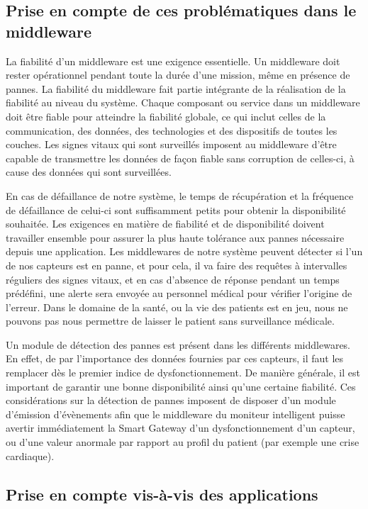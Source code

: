 \subsection{Prise en compte de ces problématiques dans le middleware}
 
La fiabilité d’un middleware est une exigence essentielle. Un middleware doit rester opérationnel pendant toute la durée d’une mission, même en présence de pannes. La fiabilité du middleware fait partie intégrante de la réalisation de la fiabilité au niveau du système. Chaque composant ou service dans un middleware doit être fiable pour atteindre la fiabilité globale, ce qui inclut celles de la communication, des données, des technologies et des dispositifs de toutes les couches. Les signes vitaux qui sont surveillés imposent au middleware d’être capable de transmettre les données de façon fiable sans corruption de celles-ci, à cause des données qui sont surveillées.

En cas de défaillance de notre système, le temps de récupération et la fréquence de défaillance de celui-ci sont suffisamment petits pour obtenir la disponibilité souhaitée. Les exigences en matière de fiabilité et de disponibilité doivent travailler ensemble pour assurer la plus haute tolérance aux pannes nécessaire depuis une application. Les middlewares de notre système peuvent détecter si l’un de nos capteurs est en panne, et pour cela, il va faire des requêtes à intervalles réguliers des signes vitaux, et en cas d’absence de réponse pendant un temps prédéfini, une alerte sera envoyée au personnel médical pour vérifier l’origine de l’erreur. Dans le domaine de la santé, ou la vie des patients est en jeu, nous ne pouvons pas nous permettre de laisser le patient sans surveillance médicale.

Un module de détection des pannes est présent dans les différents middlewares. En effet, de par l’importance des données fournies par ces capteurs, il faut les remplacer dès le premier indice de dysfonctionnement. De manière générale, il est important de garantir une bonne disponibilité ainsi qu’une certaine fiabilité. Ces considérations sur la détection de pannes imposent de disposer d’un module d’émission d’évènements afin que le middleware du moniteur intelligent puisse avertir immédiatement la Smart Gateway d’un dysfonctionnement d’un capteur, ou d’une valeur anormale par rapport au profil du patient (par exemple une crise cardiaque).

\subsection{Prise en compte vis-à-vis des applications}
 
